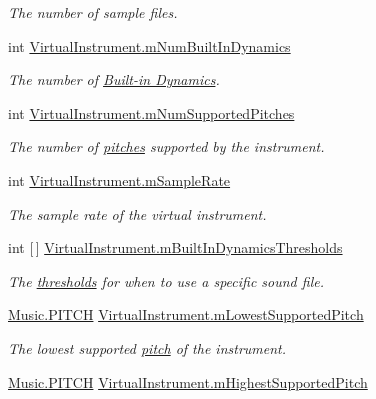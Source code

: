 \begin{DoxyCompactItemize}
\begin{DoxyCompactList}\small\item\em The number of sample files. \end{DoxyCompactList}\item 
int \hyperlink{group___v_i_base_pro_var_gac265f64f759d267ee1e1680f8d387011}{Virtual\+Instrument.\+m\+Num\+Built\+In\+Dynamics}
\begin{DoxyCompactList}\small\item\em The number of \hyperlink{group___audio_DefBID}{Built-\/in Dynamics}. \end{DoxyCompactList}\item 
int \hyperlink{group___v_i_base_pro_var_gafc759a16324cf9b3f230bcbf040afcd2}{Virtual\+Instrument.\+m\+Num\+Supported\+Pitches}
\begin{DoxyCompactList}\small\item\em The number of \hyperlink{group___music_enums_ga508f69b199ea518f935486c990edac1d}{pitches} supported by the instrument. \end{DoxyCompactList}\item 
int \hyperlink{group___v_i_base_pro_var_ga80b3d2ff29b27698eea6bcf2f8ddc5d7}{Virtual\+Instrument.\+m\+Sample\+Rate}
\begin{DoxyCompactList}\small\item\em The sample rate of the virtual instrument. \end{DoxyCompactList}\item 
int \mbox{[}$\,$\mbox{]} \hyperlink{group___v_i_base_pro_var_gae3db4264dc2a96e99ea680c6d637e6bf}{Virtual\+Instrument.\+m\+Built\+In\+Dynamics\+Thresholds}
\begin{DoxyCompactList}\small\item\em The \hyperlink{group___audio_DefBIDThresh}{thresholds} for when to use a specific sound file. \end{DoxyCompactList}\item 
\hyperlink{group___music_enums_ga508f69b199ea518f935486c990edac1d}{Music.\+P\+I\+T\+CH} \hyperlink{group___v_i_base_pro_var_ga3cae52b1bcc0178a8a6b03c7aaf7aac8}{Virtual\+Instrument.\+m\+Lowest\+Supported\+Pitch}
\begin{DoxyCompactList}\small\item\em The lowest supported \hyperlink{group___music_enums_ga508f69b199ea518f935486c990edac1d}{pitch} of the instrument. \end{DoxyCompactList}\item 
\hyperlink{group___music_enums_ga508f69b199ea518f935486c990edac1d}{Music.\+P\+I\+T\+CH} \hyperlink{group___v_i_base_pro_var_ga61fb2c33b53a0f663047779d7ceb18f3}{Virtual\+Instrument.\+m\+Highest\+Supported\+Pitch}

\end{DoxyCompactItemize}
